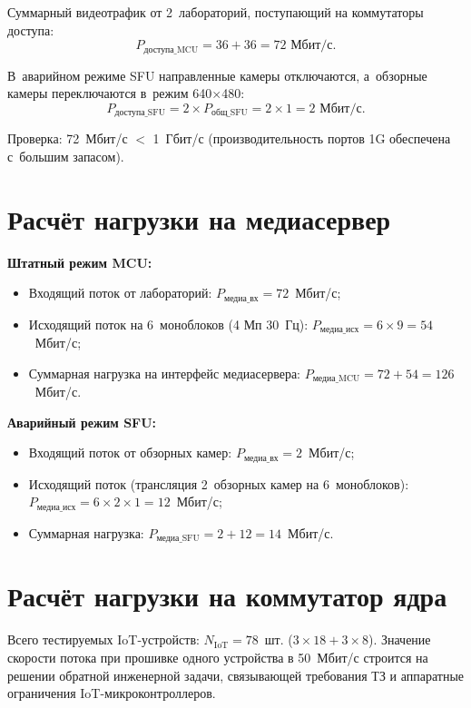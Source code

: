 \documentclass{bmstu}
\begin{document}
Суммарный видеотрафик от 2~лабораторий, поступающий на коммутаторы доступа:
\begin{equation}
    P_{\text{доступа\_MCU}} = 36 + 36 = 72 \text{ Мбит/с}.
    \label{eq:p_access_mcu}
\end{equation}

В~аварийном режиме SFU направленные камеры отключаются, а~обзорные камеры переключаются в~режим 640$\times$480:
\begin{equation}
    P_{\text{доступа\_SFU}} = 2 \times P_{\text{общ\_SFU}} = 2 \times 1 = 2 \text{ Мбит/с}.
    \label{eq:p_access_sfu}
\end{equation}

Проверка: 72~Мбит/с $<$ 1~Гбит/с (производительность портов 1G обеспечена с~большим запасом).

\section{Расчёт нагрузки на медиасервер}

\textbf{Штатный режим MCU:}
\begin{itemize}
    \item Входящий поток от лабораторий: $P_{\text{медиа\_вх}} = 72$~Мбит/с;
    \item Исходящий поток на 6~моноблоков (4 Мп 30~Гц): $P_{\text{медиа\_исх}} = 6 \times 9 = 54$~Мбит/с;
    \item Суммарная нагрузка на интерфейс медиасервера: $P_{\text{медиа\_MCU}} = 72 + 54 = 126$~Мбит/с.
\end{itemize}

\textbf{Аварийный режим SFU:}
\begin{itemize}
    \item Входящий поток от обзорных камер: $P_{\text{медиа\_вх}} = 2$~Мбит/с;
    \item Исходящий поток (трансляция 2~обзорных камер на 6~моноблоков): $P_{\text{медиа\_исх}} = 6 \times 2 \times 1 = 12$~Мбит/с;
    \item Суммарная нагрузка: $P_{\text{медиа\_SFU}} = 2 + 12 = 14$~Мбит/с.
\end{itemize}

\section{Расчёт нагрузки на коммутатор ядра}

Всего тестируемых IoT-устройств: $N_{\text{IoT}} = 78$~шт. ($3 \times 18 + 3 \times 8$). Значение скорости потока при прошивке одного устройства в 50~Мбит/с строится на решении обратной инженерной задачи, связывающей требования ТЗ и аппаратные ограничения IoT-микроконтроллеров. 
\end{document}
